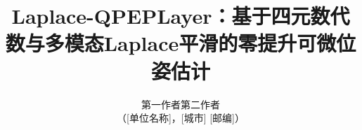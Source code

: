 \documentclass[twocolumn,10pt]{ctexart}
\begin{document}

\title{\bfseries Laplace-QPEPLayer：基于四元数代数与多模态Laplace平滑的零提升可微位姿估计}
\author{ 第一作者\quad 第二作者\\[2pt] （[单位名称]，[城市] [邮编]）}
\date{}
\maketitle

\begin{abstract}

\end{abstract}











\appendix




\end{document}
